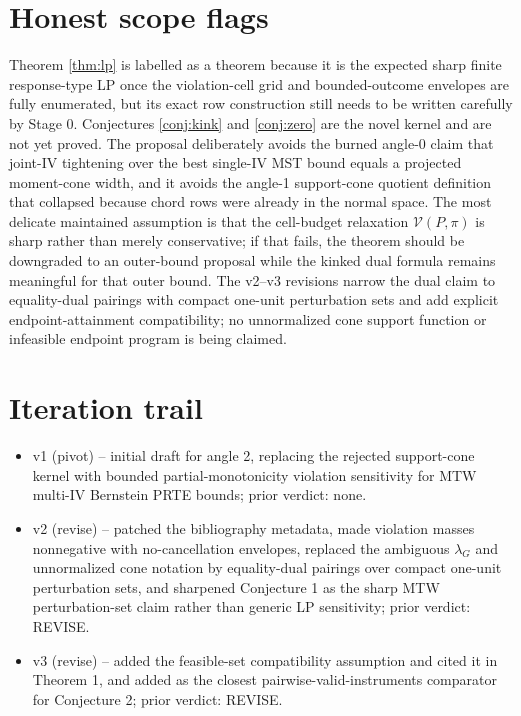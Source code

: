 \documentclass[11pt]{article}
\theoremstyle{definition}
\theoremstyle{plain}
\theoremstyle{remark}
\begin{document}
\section{Honest scope flags}
Theorem \ref{thm:lp} is labelled as a theorem because it is the expected sharp finite response-type LP once the violation-cell grid and bounded-outcome envelopes are fully enumerated, but its exact row construction still needs to be written carefully by Stage 0.  Conjectures \ref{conj:kink} and \ref{conj:zero} are the novel kernel and are not yet proved.  The proposal deliberately avoids the burned angle-0 claim that joint-IV tightening over the best single-IV MST bound equals a projected moment-cone width, and it avoids the angle-1 support-cone quotient definition that collapsed because chord rows were already in the normal space.  The most delicate maintained assumption is that the cell-budget relaxation \(\mathcal V(P,\pi)\) is sharp rather than merely conservative; if that fails, the theorem should be downgraded to an outer-bound proposal while the kinked dual formula remains meaningful for that outer bound.  The v2--v3 revisions narrow the dual claim to equality-dual pairings with compact one-unit perturbation sets and add explicit endpoint-attainment compatibility; no unnormalized cone support function or infeasible endpoint program is being claimed.

\section{Iteration trail}
\begin{itemize}[leftmargin=*]
\item v1 (pivot) -- initial draft for angle 2, replacing the rejected support-cone kernel with bounded partial-monotonicity violation sensitivity for MTW multi-IV Bernstein PRTE bounds; prior verdict: none.
\item v2 (revise) -- patched the bibliography metadata, made violation masses nonnegative with no-cancellation envelopes, replaced the ambiguous \(\lambda_G\) and unnormalized cone notation by equality-dual pairings over compact one-unit perturbation sets, and sharpened Conjecture 1 as the sharp MTW perturbation-set claim rather than generic LP sensitivity; prior verdict: REVISE.
\item v3 (revise) -- added the feasible-set compatibility assumption and cited it in Theorem 1, and added \citet{SunWuthrich2025} as the closest pairwise-valid-instruments comparator for Conjecture 2; prior verdict: REVISE.
\end{itemize}
\end{document}
